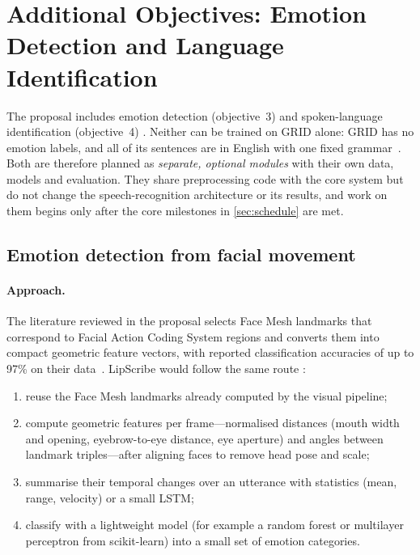 \section{Additional Objectives: Emotion Detection and Language Identification}
\label{sec:extensions}

The proposal includes emotion detection (objective~3) and spoken-language
identification (objective~4) \spec. Neither can be trained on GRID alone:
GRID has no emotion labels, and all of its sentences are in English with one
fixed grammar~\cite{cooke2006}. Both are therefore planned as \emph{separate,
optional modules} with their own data, models and evaluation. They share
preprocessing code with the core system but do not change the speech-recognition
architecture or its results, and work on them begins only after the core
milestones in \cref{sec:schedule} are met.

\subsection{Emotion detection from facial movement}
\paragraph{Approach.} The literature reviewed in the proposal selects Face Mesh
landmarks that correspond to Facial Action Coding System regions and converts
them into compact geometric feature vectors, with reported classification
accuracies of up to 97\% on their data~\cite{siam2022}. LipScribe would follow
the same route \tbd:
\begin{enumerate}
  \item reuse the Face Mesh landmarks already computed by the visual pipeline;
  \item compute geometric features per frame---normalised distances (mouth
        width and opening, eyebrow-to-eye distance, eye aperture) and angles
        between landmark triples---after aligning faces to remove head pose and
        scale;
  \item summarise their temporal changes over an utterance with statistics
        (mean, range, velocity) or a small LSTM;
  \item classify with a lightweight model (for example a random forest or
        multilayer perceptron from scikit-learn) into a small set of emotion
        categories.
\end{enumerate}

